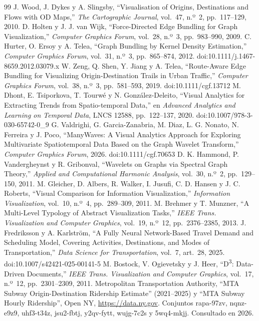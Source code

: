 \documentclass[conference,a4paper]{IEEEtran}
\begin{document}
\begin{thebibliography}{99}
\footnotesize
{} J. Wood, J. Dykes y A. Slingsby, ``Visualisation of Origins, Destinations and Flows with OD Maps,'' \emph{The Cartographic Journal}, vol.~47, n.º~2, pp.~117--129, 2010.
 D. Holten y J. J. van Wijk, ``Force-Directed Edge Bundling for Graph Visualization,'' \emph{Computer Graphics Forum}, vol.~28, n.º~3, pp.~983--990, 2009.
 C. Hurter, O. Ersoy y A. Telea, ``Graph Bundling by Kernel Density Estimation,'' \emph{Computer Graphics Forum}, vol.~31, n.º~3, pp.~865--874, 2012. doi:10.1111/j.1467-8659.2012.03079.x
 W. Zeng, Q. Shen, Y. Jiang y A. Telea, ``Route-Aware Edge Bundling for Visualizing Origin-Destination Trails in Urban Traffic,'' \emph{Computer Graphics Forum}, vol.~38, n.º~3, pp.~581--593, 2019. doi:10.1111/cgf.13712
 M. Dhont, E. Tsiporkova, T. Tourwé y N. González-Deleito, ``Visual Analytics for Extracting Trends from Spatio-temporal Data,'' en \emph{Advanced Analytics and Learning on Temporal Data}, LNCS 12588, pp.~122--137, 2020. doi:10.1007/978-3-030-65742-0\_9
 G. Valdrighi, G. Garcia-Zanabria, M. Diaz, L. G. Nonato, N. Ferreira y J. Poco, ``ManyWaves: A Visual Analytics Approach for Exploring Multivariate Spatiotemporal Data Based on the Graph Wavelet Transform,'' \emph{Computer Graphics Forum}, 2026. doi:10.1111/cgf.70653
 D. K. Hammond, P. Vandergheynst y R. Gribonval, ``Wavelets on Graphs via Spectral Graph Theory,'' \emph{Applied and Computational Harmonic Analysis}, vol.~30, n.º~2, pp.~129--150, 2011.
 M. Gleicher, D. Albers, R. Walker, I. Jusufi, C. D. Hansen y J. C. Roberts, ``Visual Comparison for Information Visualization,'' \emph{Information Visualization}, vol.~10, n.º~4, pp.~289--309, 2011.
 M. Brehmer y T. Munzner, ``A Multi-Level Typology of Abstract Visualization Tasks,'' \emph{IEEE Trans. Visualization and Computer Graphics}, vol.~19, n.º~12, pp.~2376--2385, 2013.
 J. Fredriksson y A. Karlström, ``A Fully Neural Network-Based Travel Demand and Scheduling Model, Covering Activities, Destinations, and Modes of Transportation,'' \emph{Data Science for Transportation}, vol.~7, art.~28, 2025. doi:10.1007/s42421-025-00141-5
 M. Bostock, V. Ogievetsky y J. Heer, ``D\textsuperscript{3}: Data-Driven Documents,'' \emph{IEEE Trans. Visualization and Computer Graphics}, vol.~17, n.º~12, pp.~2301--2309, 2011.
 Metropolitan Transportation Authority, ``MTA Subway Origin-Destination Ridership Estimate'' (2021--2025) y ``MTA Subway Hourly Ridership'', Open NY, \url{https://data.ny.gov}. Conjuntos rapa-97zv, nqnz-e9z9, uhf3-t34z, jsu2-fbtj, y2qv-fytt, wujg-7c2s y 5wq4-mkjj. Consultado en 2026.
\end{thebibliography}
\end{document}
